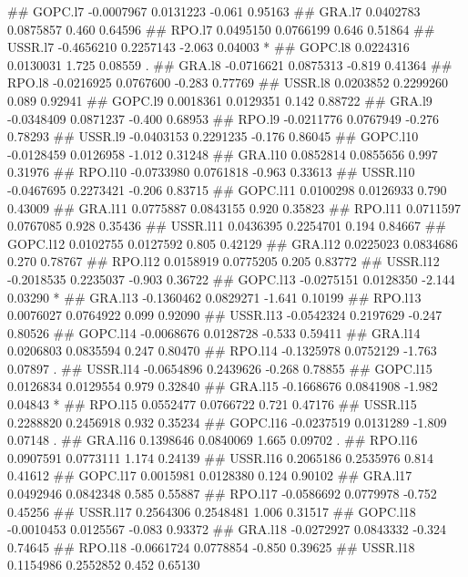 \documentclass[
]{article}
\begin{document}
\begin{itemize}
## GOPC.l7  -0.0007967  0.0131223  -0.061  0.95163    
## GRA.l7    0.0402783  0.0875857   0.460  0.64596    
## RPO.l7    0.0495150  0.0766199   0.646  0.51864    
## USSR.l7  -0.4656210  0.2257143  -2.063  0.04003 *  
## GOPC.l8   0.0224316  0.0130031   1.725  0.08559 .  
## GRA.l8   -0.0716621  0.0875313  -0.819  0.41364    
## RPO.l8   -0.0216925  0.0767600  -0.283  0.77769    
## USSR.l8   0.0203852  0.2299260   0.089  0.92941    
## GOPC.l9   0.0018361  0.0129351   0.142  0.88722    
## GRA.l9   -0.0348409  0.0871237  -0.400  0.68953    
## RPO.l9   -0.0211776  0.0767949  -0.276  0.78293    
## USSR.l9  -0.0403153  0.2291235  -0.176  0.86045    
## GOPC.l10 -0.0128459  0.0126958  -1.012  0.31248    
## GRA.l10   0.0852814  0.0855656   0.997  0.31976    
## RPO.l10  -0.0733980  0.0761818  -0.963  0.33613    
## USSR.l10 -0.0467695  0.2273421  -0.206  0.83715    
## GOPC.l11  0.0100298  0.0126933   0.790  0.43009    
## GRA.l11   0.0775887  0.0843155   0.920  0.35823    
## RPO.l11   0.0711597  0.0767085   0.928  0.35436    
## USSR.l11  0.0436395  0.2254701   0.194  0.84667    
## GOPC.l12  0.0102755  0.0127592   0.805  0.42129    
## GRA.l12   0.0225023  0.0834686   0.270  0.78767    
## RPO.l12   0.0158919  0.0775205   0.205  0.83772    
## USSR.l12 -0.2018535  0.2235037  -0.903  0.36722    
## GOPC.l13 -0.0275151  0.0128350  -2.144  0.03290 *  
## GRA.l13  -0.1360462  0.0829271  -1.641  0.10199    
## RPO.l13   0.0076027  0.0764922   0.099  0.92090    
## USSR.l13 -0.0542324  0.2197629  -0.247  0.80526    
## GOPC.l14 -0.0068676  0.0128728  -0.533  0.59411    
## GRA.l14   0.0206803  0.0835594   0.247  0.80470    
## RPO.l14  -0.1325978  0.0752129  -1.763  0.07897 .  
## USSR.l14 -0.0654896  0.2439626  -0.268  0.78855    
## GOPC.l15  0.0126834  0.0129554   0.979  0.32840    
## GRA.l15  -0.1668676  0.0841908  -1.982  0.04843 *  
## RPO.l15   0.0552477  0.0766722   0.721  0.47176    
## USSR.l15  0.2288820  0.2456918   0.932  0.35234    
## GOPC.l16 -0.0237519  0.0131289  -1.809  0.07148 .  
## GRA.l16   0.1398646  0.0840069   1.665  0.09702 .  
## RPO.l16   0.0907591  0.0773111   1.174  0.24139    
## USSR.l16  0.2065186  0.2535976   0.814  0.41612    
## GOPC.l17  0.0015981  0.0128380   0.124  0.90102    
## GRA.l17   0.0492946  0.0842348   0.585  0.55887    
## RPO.l17  -0.0586692  0.0779978  -0.752  0.45256    
## USSR.l17  0.2564306  0.2548481   1.006  0.31517    
## GOPC.l18 -0.0010453  0.0125567  -0.083  0.93372    
## GRA.l18  -0.0272927  0.0843332  -0.324  0.74645    
## RPO.l18  -0.0661724  0.0778854  -0.850  0.39625    
## USSR.l18  0.1154986  0.2552852   0.452  0.65130    

\end{itemize}
\end{document}
